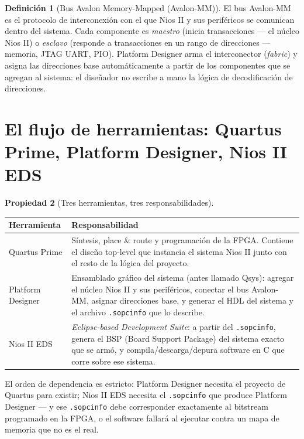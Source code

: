 \documentclass[11pt,letterpaper]{article}
\theoremstyle{definition}
\newtheorem{definicion}{Definición}[section]
\newtheorem{propiedad}[definicion]{Propiedad}
\begin{document}
\begin{definicion}[Bus Avalon Memory-Mapped (Avalon-MM)]
El bus Avalon-MM es el protocolo de interconexión con el que Nios II y sus periféricos se comunican
dentro del sistema. Cada componente es \emph{maestro} (inicia transacciones --- el núcleo Nios II) o
\emph{esclavo} (responde a transacciones en un rango de direcciones --- memoria, JTAG UART, PIO).
Platform Designer arma el interconector (\emph{fabric}) y asigna las direcciones base
automáticamente a partir de los componentes que se agregan al sistema: el diseñador no escribe a
mano la lógica de decodificación de direcciones.
\end{definicion}

\section{El flujo de herramientas: Quartus Prime, Platform Designer, Nios II EDS}

\begin{propiedad}[Tres herramientas, tres responsabilidades]
\begin{center}
\begin{tabular}{|l|p{9.5cm}|}
\hline
\textbf{Herramienta} & \textbf{Responsabilidad} \\ \hline
Quartus Prime & Síntesis, place \& route y programación de la FPGA. Contiene el diseño top-level
  que instancia el sistema Nios II junto con el resto de la lógica del proyecto. \\ \hline
Platform Designer & Ensamblado gráfico del sistema (antes llamado Qsys): agregar el núcleo Nios II
  y sus periféricos, conectar el bus Avalon-MM, asignar direcciones base, y generar el HDL del
  sistema y el archivo \texttt{.sopcinfo} que lo describe. \\ \hline
Nios II EDS & \emph{Eclipse-based Development Suite}: a partir del \texttt{.sopcinfo}, genera el
  BSP (Board Support Package) del sistema exacto que se armó, y compila/descarga/depura software en
  C que corre sobre ese sistema. \\ \hline
\end{tabular}
\end{center}
El orden de dependencia es estricto: Platform Designer necesita el proyecto de Quartus para existir;
Nios II EDS necesita el \texttt{.sopcinfo} que produce Platform Designer --- y ese \texttt{.sopcinfo}
debe corresponder exactamente al bitstream programado en la FPGA, o el software fallará al ejecutar
contra un mapa de memoria que no es el real.
\end{propiedad}
\end{document}
